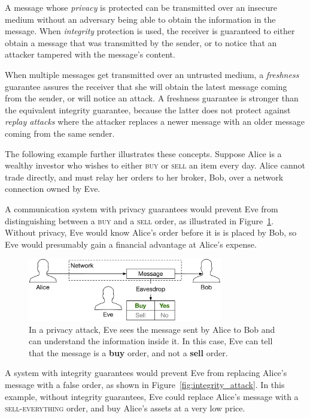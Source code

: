 A message whose \textit{privacy} is protected can be transmitted over an
insecure medium without an adversary being able to obtain the information in
the message. When \textit{integrity} protection is used, the receiver is
guaranteed to either obtain a message that was transmitted by the sender, or to
notice that an attacker tampered with the message's content.

When multiple messages get transmitted over an untrusted medium, a
\textit{freshness} guarantee assures the receiver that she will obtain the
latest message coming from the sender, or will notice an attack. A freshness
guarantee is stronger than the equivalent integrity guarantee, because the
latter does not protect against \textit{replay attacks} where the attacker
replaces a newer message with an older message coming from the same sender.

The following example further illustrates these concepts. Suppose Alice is a
wealthy investor who wishes to either \textsc{buy} or \textsc{sell} an item
every day. Alice cannot trade directly, and must relay her orders to her
broker, Bob, over a network connection owned by Eve.

A communication system with privacy guarantees would prevent Eve from
distinguishing between a \textsc{buy} and a \textsc{sell} order, as illustrated
in Figure~\ref{fig:privacy_attack}. Without privacy, Eve would know Alice's
order before it is is placed by Bob, so Eve would presumably gain a financial
advantage at Alice's expense.

\begin{figure}[hbt]
  \centering
  \includegraphics[width=85mm]{figures/privacy_attack.pdf}
  \caption{
    In a privacy attack, Eve sees the message sent by Alice to Bob and can
    understand the information inside it. In this case, Eve can tell that the
    message is a \textbf{buy} order, and not a \textbf{sell} order.
  }
  \label{fig:privacy_attack}
\end{figure}

A system with integrity guarantees would prevent Eve from replacing Alice's
message with a false order, as shown in Figure~\ref{fig:integrity_attack}. In
this example, without integrity guarantees, Eve could replace Alice's message
with a \textsc{sell-everything} order, and buy Alice's assets at a very low
price.

